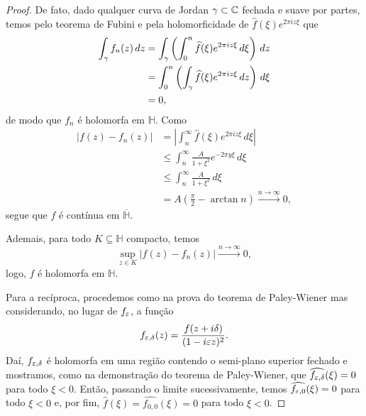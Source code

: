 \begin{proof}
            De fato, dado qualquer curva de Jordan 
            $\gamma\subset\mathbb{C}$ fechada
            e suave por partes, temos pelo teorema de Fubini e pela
            holomorficidade de $\widehat{f}(\xi)e^{2\pi iz\xi}$ que
            \begin{align*}
                \int_{\gamma} f_n(z) \, dz 
                &= \int_{\gamma}\left(\int_0^n 
                    \widehat{f}(\xi)e^{2\pi iz\xi} \, d\xi \right) 
                    \, dz \\
                &= \int_0^n \left(\int_{\gamma} 
                    \widehat{f}(\xi)e^{2\pi iz\xi} \, dz \right)
                    \, d\xi \\
                &= 0,
            \end{align*}
            de modo que $f_n$ é holomorfa em $\mathbb{H}$.
            Como
            \begin{align*}
                |f(z) - f_n(z)| 
                &= \left| \int_n^{\infty} 
                \widehat{f}(\xi)e^{2\pi iz\xi} \, d\xi \right| \\
                &\leq \int_n^{\infty} \frac{A}{1+\xi^2}e^{-2\pi y\xi}
                \, d\xi \\
                &\leq \int_n^{\infty} \frac{A}{1+\xi^2}\, d\xi \\
                &= A\left( \frac{\pi}{2} - \arctan n \right)
                \xrightarrow{n\to\infty} 0,
            \end{align*}
            segue que $f$ é contínua em $\overline{\mathbb{H}}$.
            
            Ademais, para todo $K\subseteq\mathbb{H}$ compacto,
            temos
            \begin{equation*}
                \sup_{z\in K} |f(z) - f_n(z)| 
                \xrightarrow{n\to\infty} 0,
            \end{equation*}
            logo, $f$ é holomorfa em $\mathbb{H}$.
            
            Para a recíproca, procedemos como na prova do teorema
            de Paley-Wiener mas considerando, no lugar de $f_{\varepsilon}$,
            a função
            \begin{equation*}
                f_{\varepsilon, \delta}(z) = \frac{f(z+i\delta)}{(1-i\varepsilon z)^2}.
            \end{equation*}
            Daí, $f_{\varepsilon, \delta}$ é holomorfa em uma região contendo o semi-plano
            superior fechado e mostramos, como na demonstração do teorema de 
            Paley-Wiener, que $\widehat{f_{\varepsilon, \delta}}(\xi) = 0$ para todo
            $\xi < 0$. Então, passando o limite sucessivamente, temos
            $\widehat{f_{\varepsilon,0}} (\xi) = 0$ para todo $\xi < 0$ e,
            por fim, $\widehat{f}(\xi) = \widehat{f_{0,0}} (\xi) = 0$ para todo $\xi < 0$.
        \end{proof}
